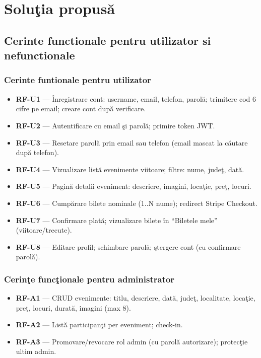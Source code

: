 \chapter{Solu\c tia propus\u a}

\section{Cerinte functionale pentru utilizator si nefunctionale}

\subsection{Cerinte funtionale pentru utilizator}

\begin{itemize}
	\item \textbf{RF-U1} --- \^Inregistrare cont: username, email, telefon, parol\u a; trimitere cod 6 cifre pe email; creare cont dup\u a verificare.
	\item \textbf{RF-U2} --- Autentificare cu email \c si parol\u a; primire token JWT.
	\item \textbf{RF-U3} --- Resetare parol\u a prin email sau telefon (email mascat la c\u autare dup\u a telefon).
	\item \textbf{RF-U4} --- Vizualizare list\u a evenimente viitoare; filtre: nume, jude\c t, dat\u a.
	\item \textbf{RF-U5} --- Pagin\u a detalii eveniment: descriere, imagini, loca\c tie, pre\c t, locuri.
	\item \textbf{RF-U6} --- Cump\u arare bilete nominale (1..N nume); redirect Stripe Checkout.
	\item \textbf{RF-U7} --- Confirmare plat\u a; vizualizare bilete \^in ``Biletele mele'' (viitoare/trecute).
	\item \textbf{RF-U8} --- Editare profil; schimbare parol\u a; \c stergere cont (cu confirmare parol\u a).
\end{itemize}

\subsection{Cerin\c te func\c tionale pentru administrator}

\begin{itemize}
	\item \textbf{RF-A1} --- CRUD evenimente: titlu, descriere, dat\u a, jude\c t, localitate, loca\c tie, pre\c t, locuri, durat\u a, imagini (max 8).
	\item \textbf{RF-A2} --- List\u a participan\c ti per eveniment; check-in.
	\item \textbf{RF-A3} --- Promovare/revocare rol admin (cu parol\u a autorizare); protec\c tie ultim admin.
\end{itemize}


